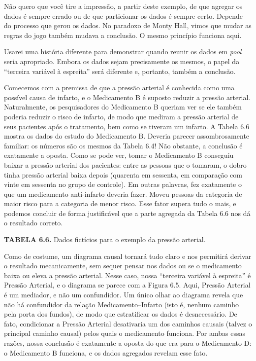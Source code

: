 \documentclass[11pt,a5paper,twoside]{book}
\begin{document}
Não quero que você tire a impressão, a partir deste exemplo, de que agregar os dados é sempre errado ou de que particionar os dados é sempre certo. Depende do processo que gerou os dados. No paradoxo de Monty Hall, vimos que mudar as regras do jogo também mudava a conclusão. O mesmo princípio funciona aqui.

Usarei uma história diferente para demonstrar quando reunir os dados em \textit{pool} seria apropriado. Embora os dados sejam precisamente os mesmos, o papel da “terceira variável à espreita” será diferente e, portanto, também a conclusão.

Comecemos com a premissa de que a pressão arterial é conhecida como uma possível causa de infarto, e o Medicamento B é suposto reduzir a pressão arterial. Naturalmente, os pesquisadores do Medicamento B queriam ver se ele também poderia reduzir o risco de infarto, de modo que mediram a pressão arterial de seus pacientes após o tratamento, bem como se tiveram um infarto. A Tabela 6.6 mostra os dados do estudo do Medicamento B. Deveria parecer assombrosamente familiar: os números são os mesmos da Tabela 6.4! Não obstante, a conclusão é exatamente a oposta. Como se pode ver, tomar o Medicamento B conseguiu baixar a pressão arterial dos pacientes: entre as pessoas que o tomaram, o dobro tinha pressão arterial baixa depois (quarenta em sessenta, em comparação com vinte em sessenta no grupo de controle). Em outras palavras, fez exatamente o que um medicamento anti-infarto deveria fazer. Moveu pessoas da categoria de maior risco para a categoria de menor risco. Esse fator supera tudo o mais, e podemos concluir de forma justificável que a parte agregada da Tabela 6.6 nos dá o resultado correto.

\textbf{TABELA 6.6.} Dados fictícios para o exemplo da pressão arterial.

Como de costume, um diagrama causal tornará tudo claro e nos permitirá derivar o resultado mecanicamente, sem sequer pensar nos dados ou se o medicamento baixa ou eleva a pressão arterial. Nesse caso, nossa “terceira variável à espreita” é Pressão Arterial, e o diagrama se parece com a Figura 6.5. Aqui, Pressão Arterial é um mediador, e não um confundidor. Um único olhar ao diagrama revela que não há confundidor da relação Medicamento–Infarto (isto é, nenhum caminho pela porta dos fundos), de modo que estratificar os dados é desnecessário. De fato, condicionar a Pressão Arterial desativaria um dos caminhos causais (talvez o principal caminho causal) pelos quais o medicamento funciona. Por ambas essas razões, nossa conclusão é exatamente a oposta do que era para o Medicamento D: o Medicamento B funciona, e os dados agregados revelam esse fato.
\end{document}

